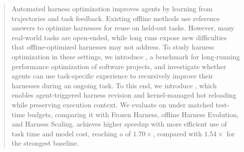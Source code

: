 
\begin{abstract}
Automated harness optimization improves agents by learning from trajectories and task feedback. Existing offline methods use reference answers to optimize harnesses for reuse on held-out tasks. However, many real-world tasks are open-ended, while long runs expose new difficulties that offline-optimized harnesses may not address. To study harness optimization in these settings, we introduce \perfrace{}, a benchmark for long-running performance optimization of software projects, and investigate whether agents can use task-specific experience to recursively improve their harnesses during an ongoing task. To this end, we introduce \boxbox{}, which enables agent-triggered harness revision and kernel-managed hot reloading while preserving execution context. We evaluate \boxbox{} on \perfrace{} under matched test-time budgets, comparing it with Frozen Harness, offline Harness Evolution, and Harness Scaling. \boxbox{} achieves higher speedup with more efficient use of task time and model cost, reaching a  of \(1.70\times\), compared with \(1.54\times\) for the strongest baseline.
\end{abstract}
